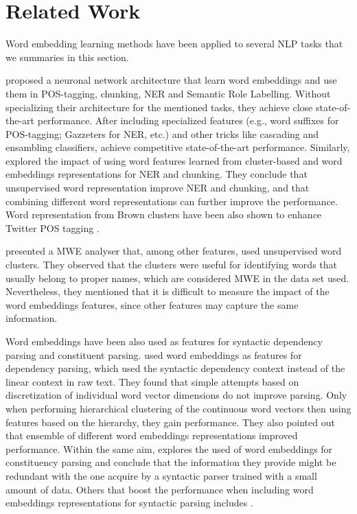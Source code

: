 
\section{Related Work}
Word embedding learning methods have been applied to several 
NLP tasks that we summaries in this section.

 proposed a neuronal network architecture
that learn word embeddings and use them in POS-tagging, chunking, NER and Semantic Role Labelling. 
Without specializing their architecture for the mentioned tasks, they achieve close state-of-the-art performance. After including specialized features (e.g., word suffixes for POS-tagging;  Gazzeters for NER, etc.) and other tricks like cascading and ensambling classifiers, achieve competitive state-of-the-art performance.
Similarly,  explored the impact of using word
features learned from cluster-based and word embeddings representations
for NER and chunking. 
They conclude that unsupervised word representation improve NER and chunking, and that combining different word representations can further improve the performance.
Word representation from Brown clusters have been also shown to enhance
Twitter POS tagging . 

 presented a MWE analyser that, among other features, used unsupervised word clusters. 
They observed that the clusters were useful for identifying words that usually belong to proper names, which are considered MWE in the data set used. Nevertheless, they mentioned that it is difficult to measure the impact of the word embeddings features, since other features may capture the same information. 

Word embeddings have been also used as features for syntactic dependency parsing and constituent parsing. 
 used word embeddings as features for dependency parsing, which used the syntactic dependency context instead of the linear context in raw text. They found that simple attempts based on discretization of individual word vector dimensions do not improve parsing. Only when performing hierarchical clustering of the continuous word vectors then using features based on the hierarchy, they gain performance. They also pointed out that ensemble of different word embeddings representations improved performance.
Within the same aim,  explores the used of word embeddings for constituency parsing and conclude that the
information they provide might be redundant with the one acquire by a syntactic parser trained with a small amount of data. Others that boost the performance when including word embeddings representations for syntactic parsing includes \cite{Koo:2008,Koo:2010,Haffari:2011,Tratz:2011}.

